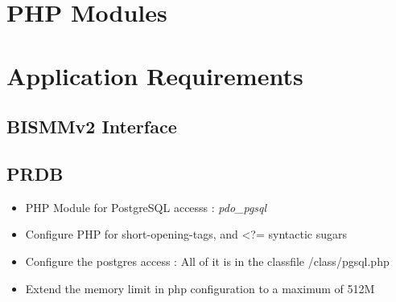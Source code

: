 \documentclass[12pt]{article}
\begin{document}
\section{PHP Modules}\label{results}

\section{Application Requirements}\label{conclusions}
\subsection*{BISMMv2 Interface}
\subsection*{PRDB}
\begin{itemize}
\item PHP Module for PostgreSQL accesss : \textit{pdo\_pgsql} 
\item Configure PHP for short-opening-tags, and <?= syntactic sugars
\item Configure the postgres access : All of it is in the classfile /class/pgsql.php
\item Extend the memory limit in php configuration to a maximum of 512M
\end{itemize}
\end{document}
